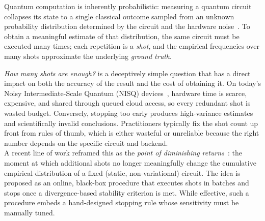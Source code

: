 \documentclass[runningheads]{llncs}
\begin{document}
Quantum computation is inherently probabilistic: measuring a quantum circuit
collapses its state to a single classical outcome sampled from an unknown
probability distribution determined by the circuit and the hardware
noise~\cite{nielsen2010quantum}. To obtain a meaningful estimate of that
distribution, the same circuit must be executed many times; each repetition is a
\emph{shot}, and the empirical frequencies over many shots approximate the
underlying \emph{ground truth}.

\textit{How many shots are enough?} is a deceptively simple question that has a direct impact
on both the accuracy of the result and the cost of obtaining it. On today's
Noisy Intermediate-Scale Quantum (NISQ) devices~\cite{preskill2018nisq},
hardware time is scarce, expensive, and shared through queued cloud access, so
every redundant shot is wasted budget. Conversely, stopping too early produces
high-variance estimates and scientifically invalid conclusions. Practitioners
typically fix the shot count up front from rules of thumb, which is either
wasteful or unreliable because the right number depends on the specific circuit
and backend.\\
A recent line of work reframed this as the \emph{point of diminishing
returns}~\cite{bisicchia2026shots}: the moment at which additional shots no
longer meaningfully change the cumulative empirical distribution of a fixed
(static, non-variational) circuit. The idea is proposed as an online,
black-box procedure that executes shots in batches and stops once a
divergence-based stability criterion is met. While effective, such a procedure
embeds a hand-designed stopping rule whose sensitivity must be manually tuned.
\end{document}
